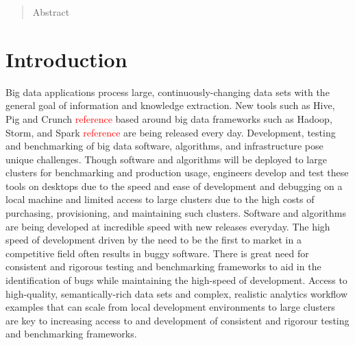 \documentclass[conference]{IEEEtran}
\begin{document}
\begin{abstract}
Abstract
\end{abstract}





%
\IEEEpeerreviewmaketitle



\section{Introduction}
Big data applications process large, continuously-changing data sets with the general goal of information and knowledge extraction.  New tools such as Hive, Pig and Crunch \textcolor{red}{reference} based around big data frameworks such as Hadoop, Storm, and Spark \textcolor{red}{reference} are being released every day. Development, testing and benchmarking of big data software, algorithms, and infrastructure pose unique challenges.  Though software and algorithms will be deployed to large clusters for benchmarking and production usage, engineers develop and test these tools on desktops due to the speed and ease of development and debugging on a local machine and limited access to large clusters due to the high costs of purchasing, provisioning, and maintaining such clusters.  Software and algorithms are being developed at incredible speed with new releases everyday. The high speed of development driven by the need to be the first to market in a competitive field often results in buggy software.  There is great need for consistent and rigorous testing and benchmarking frameworks to aid in the identification of bugs while maintaining the high-speed of development.  Access to high-quality, semantically-rich data sets and complex, realistic analytics workflow examples that can scale from local development environments to large clusters are key to increasing access to and development of consistent and rigorour testing and benchmarking frameworks.
\end{document}
